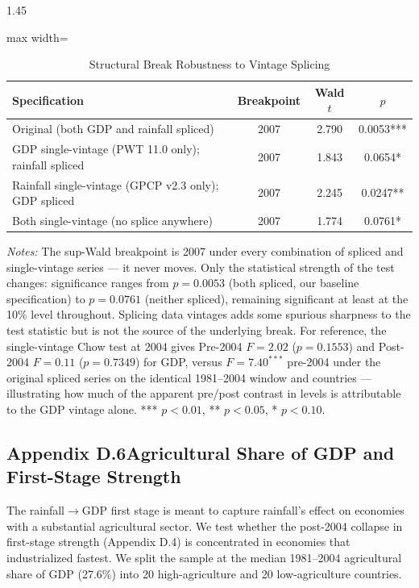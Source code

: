 \documentclass[12pt]{article}
\begin{document}
\begin{bibunit}[jpe]
\begin{spacing}{1.45}
\begin{table}[H]
\centering
\begin{adjustbox}{max width=\textwidth}
\begin{threeparttable}
\caption{Structural Break Robustness to Vintage Splicing}
\label{tab:D5}
\begin{tabular}{lccc}
\toprule
Specification & Breakpoint & Wald $t$ & $p$ \\
\midrule
Original (both GDP and rainfall spliced)   & 2007 & 2.790 & 0.0053*** \\
GDP single-vintage (PWT 11.0 only); rainfall spliced & 2007 & 1.843 & 0.0654* \\
Rainfall single-vintage (GPCP v2.3 only); GDP spliced & 2007 & 2.245 & 0.0247** \\
Both single-vintage (no splice anywhere)   & 2007 & 1.774 & 0.0761* \\
\bottomrule
\end{tabular}
\begin{tablenotes}[flushleft]
\footnotesize
\item \textit{Notes:} The sup-Wald breakpoint is 2007 under every combination of spliced and single-vintage series --- it never moves. Only the statistical strength of the test changes: significance ranges from $p=0.0053$ (both spliced, our baseline specification) to $p=0.0761$ (neither spliced), remaining significant at least at the 10\% level throughout. Splicing data vintages adds some spurious sharpness to the test statistic but is not the source of the underlying break. For reference, the single-vintage Chow test at 2004 gives Pre-2004 $F=2.02$ ($p=0.1553$) and Post-2004 $F=0.11$ ($p=0.7349$) for GDP, versus $F=7.40^{***}$ pre-2004 under the original spliced series on the identical 1981--2004 window and countries --- illustrating how much of the apparent pre/post contrast in levels is attributable to the GDP vintage alone. *** $p<0.01$, ** $p<0.05$, * $p<0.10$.
\end{tablenotes}
\end{threeparttable}
\end{adjustbox}
\end{table}

\subsection*{Appendix D.6\quad Agricultural Share of GDP and First-Stage Strength}

The rainfall$\to$GDP first stage is meant to capture rainfall's effect on economies with a substantial agricultural sector. We test whether the post-2004 collapse in first-stage strength (Appendix D.4) is concentrated in economies that industrialized fastest. We split the sample at the median 1981--2004 agricultural share of GDP (27.6\%) into 20 high-agriculture and 20 low-agriculture countries.


\end{spacing}
\end{bibunit}
\end{document}
